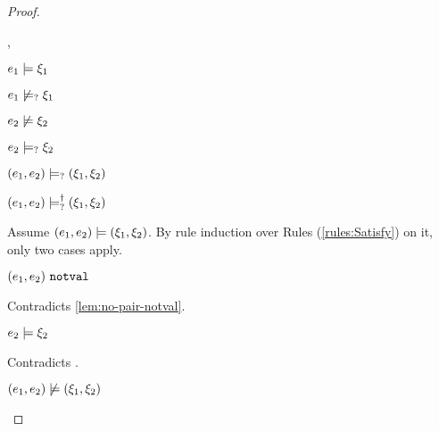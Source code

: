 \begin{proof}
\begin{byCases}
\begin{byCases}
\begin{byCases}
        \item[\csatisfy{e_1}{\xi_1},\cmaysatisfy{e_2}{\xi_2}]
            \begin{pfsteps*}
            \item $e_1 \models \xi_1$  
            \item $e_1 \not\models_{?} \xi_1$  
            \item $e_2 \not\models \xi_2$  
            \item $e_2 \models_{?} \xi_2$  
            \item $(e_1 , e_2) \models_{?} (\xi_1 , \xi_2)$  
            \item $(e_1 , e_2) \models_{?}^{\dag} (\xi_1 , \xi_2)$ 
            \end{pfsteps*}
            Assume $(e_1 , e_2) \models (\xi_1 , \xi_2)$. By rule induction over Rules (\ref{rules:Satisfy}) on it, only two cases apply. 
           \begin{byCases}
            \item[\text{(\ref{rule:CSNotValPair})}]
                \begin{pfsteps*}
                \item $(e_1 , e_2) ~\mathtt{notval}$ 
                \end{pfsteps*}
                Contradicts \autoref{lem:no-pair-notval}.
            \item[\text{(\ref{rule:CSPair})}]
                \begin{pfsteps*}
                \item $e_2 \models \xi_2$ 
                \end{pfsteps*}
                Contradicts .
            \end{byCases}
            \begin{pfsteps*}
            \item $(e_1 , e_2) \not\models (\xi_1 , \xi_2)$ 
            \end{pfsteps*}
            

\end{byCases}
\end{byCases}
\end{byCases}
\end{proof}
